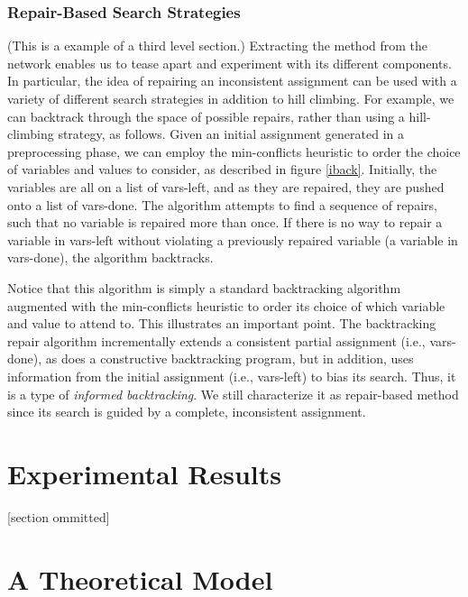 \documentclass[twoside,12pt,titlepage,a4paper]{article}
\begin{document}
\subsubsection{Repair-Based Search Strategies}

(This is a example of a third level section.)
Extracting the method from the network enables us
to tease apart and experiment with its different components.
In particular, the idea of repairing an inconsistent assignment
can be used with a variety of different search strategies
in addition to hill climbing.
For example, we can backtrack through the space of possible repairs,
rather than using a hill-climbing strategy, as follows.
Given an initial assignment generated in a preprocessing phase, 
we can employ the min-conflicts
heuristic to order the choice of variables and values to consider,
as described in figure \ref{iback}.
Initially, the variables are all on a list
of {\sc vars-left}, and as they are repaired, they are pushed onto a 
list of {\sc vars-done}. 
The algorithm attempts
to find a sequence of repairs, such that no variable is repaired more than
once. If there is no way to repair a variable in {\sc vars-left} without
violating a previously repaired variable (a variable in {\sc vars-done}),
the algorithm backtracks.

Notice that this algorithm is simply a standard
backtracking algorithm augmented with the min-conflicts heuristic to
order its choice of which variable and value to attend to.  This
illustrates an important point. The backtracking repair algorithm
incrementally extends a consistent partial assignment (i.e., {\sc
vars-done}), as does a constructive backtracking program, but in addition,
uses information from the initial assignment (i.e., {\sc vars-left})
to bias its search. Thus, it is a type of {\em informed backtracking}.
We still characterize it as repair-based method since its search
is guided by a complete, inconsistent assignment.


\section{Experimental Results}

\label{results}

 [section ommitted]

\section{A Theoretical Model}
\label{analysis}
\end{document}
